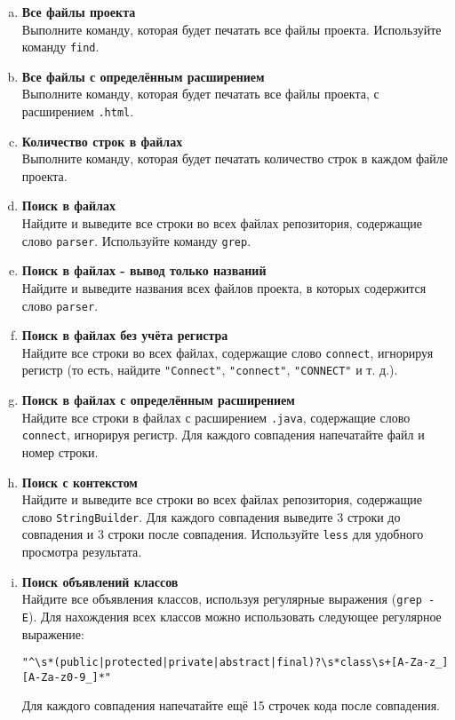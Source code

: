 \documentclass{article}
\begin{document}
\begin{enumerate}[a.]
\item \textbf{Все файлы проекта}\\
Выполните команду, которая будет печатать все файлы проекта. Используйте команду \texttt{find}.

\item \textbf{Все файлы с определённым расширением}\\
Выполните команду, которая будет печатать все файлы проекта, с расширением \texttt{.html}.

\item \textbf{Количество строк в файлах}\\
Выполните команду, которая будет печатать количество строк в каждом файле проекта.

\item \textbf{Поиск в файлах}\\
Найдите и выведите все строки во всех файлах репозитория, содержащие слово \texttt{parser}. Используйте команду \texttt{grep}.

\item \textbf{Поиск в файлах - вывод только названий}\\
Найдите и выведите названия всех файлов проекта, в которых содержится слово \texttt{parser}.

\item \textbf{Поиск в файлах без учёта регистра}\\
Найдите все строки во всех файлах, содержащие слово \texttt{connect}, игнорируя регистр (то есть, найдите \texttt{"Connect"}, \texttt{"connect"}, \texttt{"CONNECT"} и т. д.).

\item \textbf{Поиск в файлах с определённым расширением}\\
Найдите все строки в файлах с расширением \texttt{.java}, содержащие слово \texttt{connect}, игнорируя регистр. Для каждого совпадения напечатайте файл и номер строки.

\item \textbf{Поиск с контекстом}\\
Найдите и выведите все строки во всех файлах репозитория, содержащие слово \texttt{StringBuilder}. Для каждого совпадения выведите 3 строки до совпадения и 3 строки после совпадения. Используйте \texttt{less} для удобного просмотра результата.


\item \textbf{Поиск объявлений классов}\\
Найдите все объявления классов, используя регулярные выражения (\texttt{grep -E}).
Для нахождения всех классов можно использовать следующее регулярное выражение:
\begin{lstlisting}
"^\s*(public|protected|private|abstract|final)?\s*class\s+[A-Za-z_][A-Za-z0-9_]*"
\end{lstlisting}
Для каждого совпадения напечатайте ещё 15 строчек кода после совпадения.
 

\end{enumerate}
\end{document}
